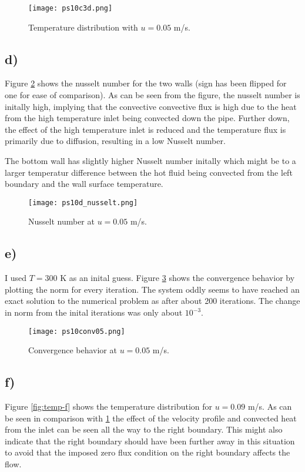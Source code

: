 \documentclass{article}
\begin{document}
\begin{figure}
\texttt{[image: ps10c3d.png]}
\caption{Temperature distribution with $u=0.05$ m/s.}
\label{fig:temp-c}
\end{figure}

\subsection{d)}
Figure \ref{fig:nusselt-d} shows the nusselt number for the two walls (sign has been flipped for one for ease of comparison). As can be seen from the figure, the nusselt number is initally high, implying that the convective convective flux is high due to the heat from the high temperature inlet being convected down the pipe. Further down, the effect of the high temperature inlet is reduced and the temperature flux is primarily due to diffusion, resulting in a low Nusselt number.

The bottom wall has slightly higher Nusselt number initally which might be to a larger temperatur difference between the hot fluid being convected from the left boundary and the wall surface temperature.

\begin{figure}
\texttt{[image: ps10d\_nusselt.png]}
\caption{Nusselt number at $u=0.05$ m/s.}
\label{fig:nusselt-d}
\end{figure}

\subsection{e)}
I used $T=300$ K as an inital guess. Figure \ref{fig:conv-e} shows the convergence behavior by plotting the norm for every iteration. The system oddly seems to have reached an exact solution to the numerical problem as after about 200 iterations. The change in norm from the inital iterations was only about $10^{-3}$.

\begin{figure}
\texttt{[image: ps10conv05.png]}
\caption{Convergence behavior at $u=0.05$ m/s.}
\label{fig:conv-e}
\end{figure}

\subsection{f)}
Figure \ref{fig:temp-f} shows the temperature distribution for $u=0.09$ m/s. As can be seen in comparison with \ref{fig:temp-c} the effect of the velocity profile and convected heat from the inlet can be seen all the way to the right boundary. This might also indicate that the right boundary should have been further away in this situation to avoid that the imposed zero flux condition on the right boundary affects the flow.
\end{document}

